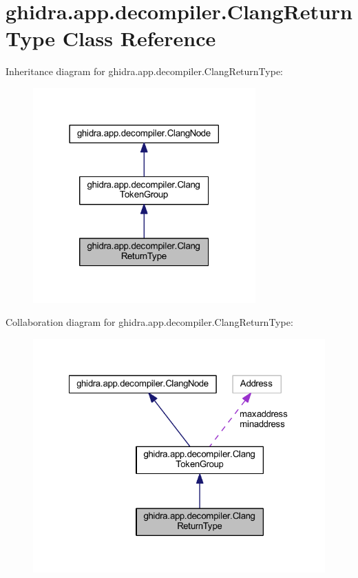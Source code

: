 \hypertarget{classghidra_1_1app_1_1decompiler_1_1_clang_return_type}{}\section{ghidra.\+app.\+decompiler.\+Clang\+Return\+Type Class Reference}
\label{classghidra_1_1app_1_1decompiler_1_1_clang_return_type}


Inheritance diagram for ghidra.\+app.\+decompiler.\+Clang\+Return\+Type\+:
\nopagebreak
\begin{figure}[H]
\begin{center}
\leavevmode
\includegraphics[width=242pt]{classghidra_1_1app_1_1decompiler_1_1_clang_return_type__inherit__graph}
\end{center}
\end{figure}


Collaboration diagram for ghidra.\+app.\+decompiler.\+Clang\+Return\+Type\+:
\nopagebreak
\begin{figure}[H]
\begin{center}
\leavevmode
\includegraphics[width=322pt]{classghidra_1_1app_1_1decompiler_1_1_clang_return_type__coll__graph}
\end{center}
\end{figure}
